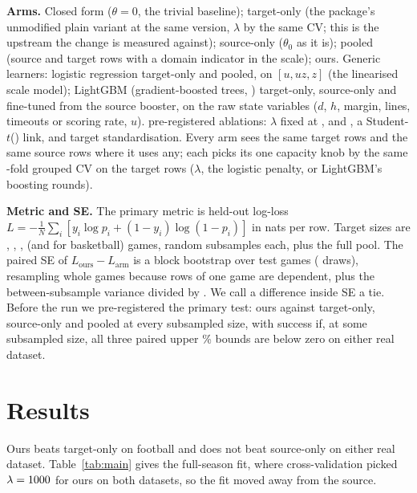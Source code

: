 \documentclass{article}
\begin{document}
\textbf{Arms.}
Closed form ($\theta = 0$, the trivial baseline); target-only (the package's unmodified plain variant at the same version, $\lambda$ by the same CV; this is the upstream the change is measured against); source-only ($\theta_0$ as it is); pooled (source and target rows with a domain indicator in the scale); ours.
Generic learners: logistic regression \citep{pedregosa2011sklearn} target-only and pooled, on $[u, u z, z]$ (the linearised scale model); LightGBM (gradient-boosted trees, \citealp{ke2017lightgbm}) target-only, source-only and fine-tuned from the source booster, on the raw state variables ($d$, $h$, margin, lines, timeouts or scoring rate, $u$).
\nAblations{} pre-registered ablations: $\lambda$ fixed at \nLamGridA, \nLamGridC{} and \nLamGridE, a Student-$t$(\nTdf) link, and target standardisation.
Every arm sees the same target rows and the same source rows where it uses any; each picks its one capacity knob by the same \nCvFolds-fold grouped CV on the target rows ($\lambda$, the logistic penalty, or LightGBM's boosting rounds).

\textbf{Metric and SE.}
The primary metric is held-out log-loss $L = -\tfrac{1}{N}\sum_i [y_i \log p_i + (1-y_i)\log(1-p_i)]$ in nats per row.
Target sizes are \nFbAGames, \nFbBGames, \nFbCGames, \nFbDGames{} (and \nHpEGames{} for basketball) games, \nSubsamples{} random subsamples each, plus the full pool.
The paired SE of $L_{\text{ours}} - L_{\text{arm}}$ is a block bootstrap over test games (\nBootDraws{} draws), resampling whole games because rows of one game are dependent, plus the between-subsample variance divided by \nSubsamples.
We call a difference inside \nZcrit{} SE a tie.
Before the run we pre-registered the primary test: ours against target-only, source-only and pooled at every subsampled size, with success if, at some subsampled size, all three paired upper \nCiPct\% bounds are below zero on either real dataset.

\section{Results}
\label{sec:results}

Ours beats target-only on football and does not beat source-only on either real dataset.
Table~\ref{tab:main} gives the full-season fit, where cross-validation picked $\lambda = 1000$ for ours on both datasets, so the fit moved away from the source.
\end{document}
